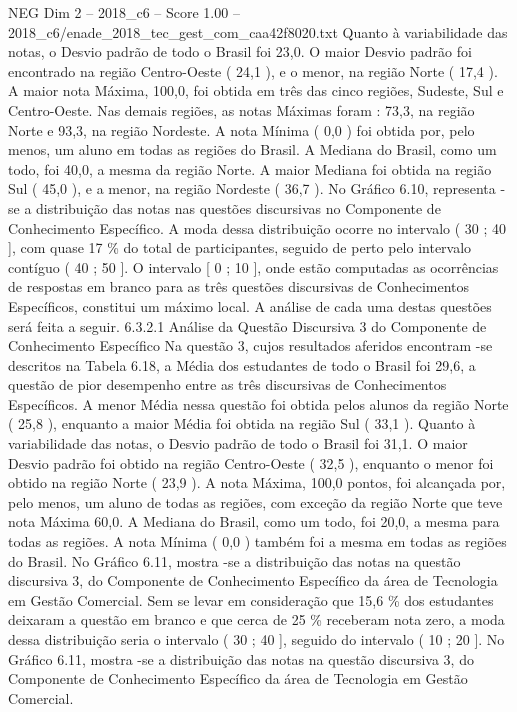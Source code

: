 \begin{textsample}{NEG Dim 2 – 2018\_c6 – Score 1.00 – 2018\_c6/enade\_2018\_tec\_gest\_com\_caa42f8020.txt}
Quanto à variabilidade das notas, o Desvio padrão de todo o Brasil foi 23,0.
O maior Desvio padrão foi encontrado na região Centro-Oeste ( 24,1 ), e o menor, na região Norte ( 17,4 ).
A maior nota Máxima, 100,0, foi obtida em três das cinco regiões, Sudeste, Sul e Centro-Oeste.
Nas demais regiões, as notas Máximas foram : 73,3, na região Norte e 93,3, na região Nordeste.
A nota Mínima ( 0,0 ) foi obtida por, pelo menos, um aluno em todas as regiões do Brasil.
A Mediana do Brasil, como um todo, foi 40,0, a mesma da região Norte.
A maior Mediana foi obtida na região Sul ( 45,0 ), e a menor, na região Nordeste ( 36,7 ).
No Gráfico 6.10, representa -se a distribuição das notas nas questões discursivas no Componente de Conhecimento Específico.
A moda dessa distribuição ocorre no intervalo ( 30 ; 40 ], com quase 17 \% do total de participantes, seguido de perto pelo intervalo contíguo ( 40 ; 50 ].
O intervalo [ 0 ; 10 ], onde estão computadas as ocorrências de respostas em branco para as três questões discursivas de Conhecimentos Específicos, constitui um máximo local.
A análise de cada uma destas questões será feita a seguir. 6.3.2.1 Análise da Questão Discursiva 3 do Componente de Conhecimento Específico Na questão 3, cujos resultados aferidos encontram -se descritos na Tabela 6.18, a Média dos estudantes de todo o Brasil foi 29,6, a questão de pior desempenho entre as três discursivas de Conhecimentos Específicos.
A menor Média nessa questão foi obtida pelos alunos da região Norte ( 25,8 ), enquanto a maior Média foi obtida na região Sul ( 33,1 ).
Quanto à variabilidade das notas, o Desvio padrão de todo o Brasil foi 31,1.
O maior Desvio padrão foi obtido na região Centro-Oeste ( 32,5 ), enquanto o menor foi obtido na região Norte ( 23,9 ).
A nota Máxima, 100,0 pontos, foi alcançada por, pelo menos, um aluno de todas as regiões, com exceção da região Norte que teve nota Máxima 60,0.
A Mediana do Brasil, como um todo, foi 20,0, a mesma para todas as regiões.
A nota Mínima ( 0,0 ) também foi a mesma em todas as regiões do Brasil.
No Gráfico 6.11, mostra -se a distribuição das notas na questão discursiva 3, do Componente de Conhecimento Específico da área de Tecnologia em Gestão Comercial.
Sem se levar em consideração que 15,6 \% dos estudantes deixaram a questão em branco e que cerca de 25 \% receberam nota zero, a moda dessa distribuição seria o intervalo ( 30 ; 40 ], seguido do intervalo ( 10 ; 20 ].
No Gráfico 6.11, mostra -se a distribuição das notas na questão discursiva 3, do Componente de Conhecimento Específico da área de Tecnologia em Gestão Comercial.

\end{textsample}
